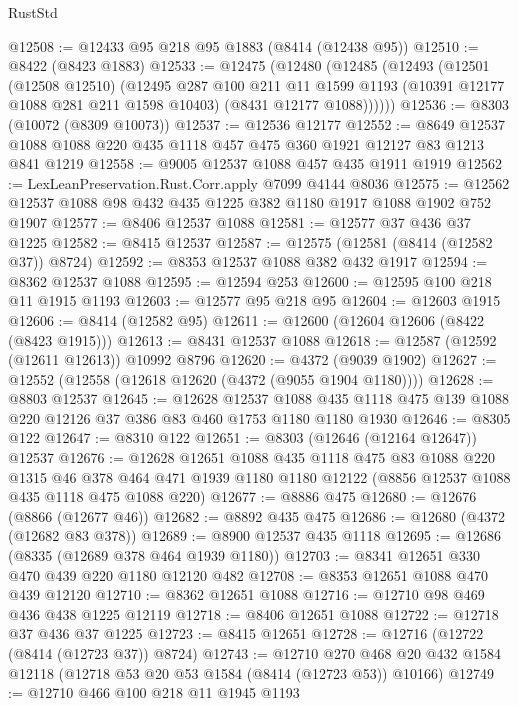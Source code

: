 \begin{lexlean}{RustStd}
\begin{coremodule}
@12508 := @12433 @95 @218 @95 @1883 (@8414 (@12438 @95))
@12510 := @8422 (@8423 @1883)
@12533 := @12475
    (@12480
      (@12485
        (@12493
          (@12501
            (@12508 @12510)
            (@12495
              @287
              @100
              @211
              @11
              @1599
              @1193
              (@10391 @12177 @1088 @281 @211 @1598 @10403)
              (@8431 @12177 @1088))))))
@12536 := @8303 (@10072 (@8309 @10073))
@12537 := @12536 @12177
@12552 := @8649 @12537 @1088 @1088 @220 @435 @1118 @457 @475 @360 @1921 @12127 @83 @1213 @841 @1219
@12558 := @9005 @12537 @1088 @457 @435 @1911 @1919
@12562 := LexLeanPreservation.Rust.Corr.apply @7099 @4144 @8036
@12575 := @12562 @12537 @1088 @98 @432 @435 @1225 @382 @1180 @1917 @1088 @1902 @752 @1907
@12577 := @8406 @12537 @1088
@12581 := @12577 @37 @436 @37 @1225
@12582 := @8415 @12537
@12587 := @12575 (@12581 (@8414 (@12582 @37)) @8724)
@12592 := @8353 @12537 @1088 @382 @432 @1917
@12594 := @8362 @12537 @1088
@12595 := @12594 @253
@12600 := @12595 @100 @218 @11 @1915 @1193
@12603 := @12577 @95 @218 @95
@12604 := @12603 @1915
@12606 := @8414 (@12582 @95)
@12611 := @12600 (@12604 @12606 (@8422 (@8423 @1915)))
@12613 := @8431 @12537 @1088
@12618 := @12587 (@12592 (@12611 @12613)) @10992 @8796
@12620 := @4372 (@9039 @1902)
@12627 := @12552 (@12558 (@12618 @12620 (@4372 (@9055 @1904 @1180))))
@12628 := @8803 @12537
@12645 := @12628
    @12537
    @1088
    @435
    @1118
    @475
    @139
    @1088
    @220
    @12126
    @37
    @386
    @83
    @460
    @1753
    @1180
    @1180
    @1930
@12646 := @8305 @122
@12647 := @8310 @122
@12651 := @8303 (@12646 (@12164 @12647)) @12537
@12676 := @12628
    @12651
    @1088
    @435
    @1118
    @475
    @83
    @1088
    @220
    @1315
    @46
    @378
    @464
    @471
    @1939
    @1180
    @1180
    @12122
    (@8856 @12537 @1088 @435 @1118 @475 @1088 @220)
@12677 := @8886 @475
@12680 := @12676 (@8866 (@12677 @46))
@12682 := @8892 @435 @475
@12686 := @12680 (@4372 (@12682 @83 @378))
@12689 := @8900 @12537 @435 @1118
@12695 := @12686 (@8335 (@12689 @378 @464 @1939 @1180))
@12703 := @8341 @12651 @330 @470 @439 @220 @1180 @12120 @482
@12708 := @8353 @12651 @1088 @470 @439 @12120
@12710 := @8362 @12651 @1088
@12716 := @12710 @98 @469 @436 @438 @1225 @12119
@12718 := @8406 @12651 @1088
@12722 := @12718 @37 @436 @37 @1225
@12723 := @8415 @12651
@12728 := @12716 (@12722 (@8414 (@12723 @37)) @8724)
@12743 := @12710
    @270
    @468
    @20
    @432
    @1584
    @12118
    (@12718 @53 @20 @53 @1584 (@8414 (@12723 @53)) @10166)
@12749 := @12710 @466 @100 @218 @11 @1945 @1193

\end{coremodule}
\end{lexlean}
